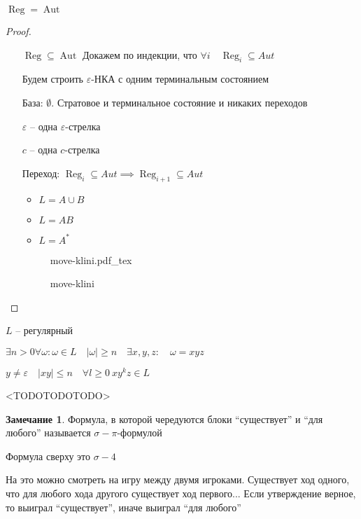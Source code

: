 \documentclass{book}
\renewcommand\O{\ensuremath{\emptyset}}
\DeclareMathOperator{\Reg}{Reg}
\DeclareMathOperator{\Aut}{Aut}
\theoremstyle{definition}
\newtheorem*{note}{Замечание}
\newcommand{\incfig}[1]{%
    \def\svgwidth{\columnwidth}
    {#1.pdf_tex}
}
\begin{document}
\begin{theorem}
    [Клини]
    $\Reg = \Aut$
\end{theorem}
\begin{proof}
    \begin{enumerate}
        \item []
        \item [$\Reg \subseteq  \Aut$] Докажем по индекции, что $\forall i\quad \Reg_i\subseteq Aut$

            Будем строить $\varepsilon$-НКА с одним терминальным состоянием

            База: $\O $. Стратовое и терминальное состояние и никаких переходов

            $\varepsilon$ -- одна $\varepsilon$-стрелка

            $c$ -- одна  $c$-стрелка

            Переход:  $\Reg_i \subseteq Aut \implies \Reg_{i+1}\subseteq Aut$

            \begin{itemize}
                \item $L = A\cup B$ 
                \item $L = AB$
                \item  $L = A^*$
            \end{itemize}

\begin{figure}[!ht]
    \centering
    \incfig{move-klini}
    \caption{move-klini}
    \label{fig:move-klini}
\end{figure}
    \end{enumerate}
\end{proof}

\begin{theorem}

    $L$ -- регулярный

    $\exists n > 0 \forall \omega : \omega \in L\quad \left| \omega \right| \geqslant n\quad \exists x, y, z:\quad \omega = xyz$

    $y\neq \varepsilon\quad \left| xy \right| \leqslant n\quad \forall l\geqslant 0\ xy^kz\in L$

\end{theorem}

<TODOTODOTODO>

\begin{note}
    Формула, в которой чередуются блоки ``существует'' и ``для любого'' называется $\sigma-\pi$-формулой

    Формула сверху это $\sigma-4$

    На это можно смотреть на игру между двумя игроками. Существует ход одного, что для любого хода другого существует ход первого... Если утверждение верное, то выиграл ``существует'', иначе выиграл ``для любого''
\end{note}
\end{document}
